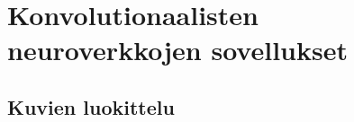 \documentclass[finnish]{tktltiki2}
\theoremstyle{definition}
\theoremstyle{remark}
\begin{document}
  \section{Konvolutionaalisten neuroverkkojen sovellukset}
  \subsection{Kuvien luokittelu}












  \nocite{*}
  
  





  
\end{document}
